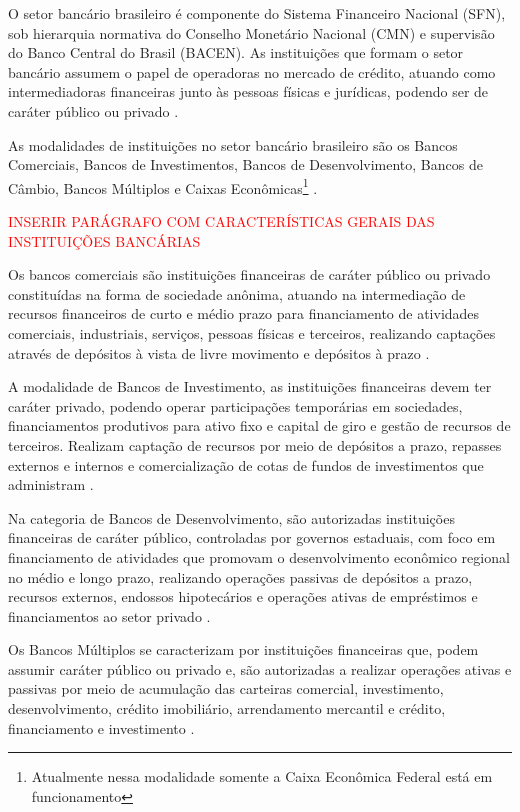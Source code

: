 \documentclass[12pt,openright,oneside,a4paper,chapter=TITLE,section=TITLE,subsection=TITLE,english,french,spanish,portugues,sumario=tradicional]{04-class-files/abntex2}
\begin{document}
O setor bancário brasileiro é componente do Sistema Financeiro Nacional (SFN),
sob hierarquia normativa do Conselho Monetário Nacional (CMN) e supervisão do
Banco Central do Brasil (BACEN). As instituições que formam o setor bancário
assumem o papel de operadoras no mercado de crédito, atuando como
intermediadoras financeiras junto às pessoas físicas e jurídicas, podendo ser
de caráter público ou privado \cite{Lei:4595:1964}.

As modalidades de instituições no setor bancário brasileiro são os Bancos
Comerciais, Bancos de Investimentos, Bancos de Desenvolvimento, Bancos de
Câmbio, Bancos Múltiplos e Caixas Econômicas\footnote{Atualmente nessa
modalidade somente a Caixa Econômica Federal está em funcionamento}
\cite{Lei:4595:1964}.

\textcolor{red}{INSERIR PARÁGRAFO COM CARACTERÍSTICAS GERAIS DAS INSTITUIÇÕES BANCÁRIAS}

Os bancos comerciais são instituições financeiras de caráter público ou privado
constituídas na forma de sociedade anônima, atuando na intermediação de
recursos financeiros de curto e médio prazo para financiamento de atividades
comerciais, industriais, serviços, pessoas físicas e terceiros, realizando
captações através de depósitos à vista de livre movimento e depósitos à prazo
\cite{Res:2099:1994}.

A modalidade de Bancos de Investimento, as instituições financeiras devem ter
caráter privado, podendo operar participações temporárias em sociedades,
financiamentos produtivos para ativo fixo e capital de giro e gestão de
recursos de terceiros. Realizam captação de recursos por meio de depósitos a
prazo, repasses externos e internos e comercialização de cotas de fundos de
investimentos que administram \cite{Res:2624:1999}.

Na categoria de Bancos de Desenvolvimento, são autorizadas instituições
financeiras de caráter público, controladas por governos estaduais, com foco em
financiamento de atividades que promovam o desenvolvimento econômico regional
no médio e longo prazo, realizando operações passivas de depósitos a prazo,
recursos externos, endossos hipotecários e operações ativas de empréstimos e
financiamentos ao setor privado \cite{Res:394:1976}.

Os Bancos Múltiplos se caracterizam por instituições financeiras que, podem
assumir caráter público ou privado e, são autorizadas a realizar operações
ativas e passivas por meio de acumulação das carteiras comercial, investimento,
desenvolvimento, crédito imobiliário, arrendamento mercantil e crédito, financiamento e investimento \cite{Res:2099:1994}.
\end{document}
